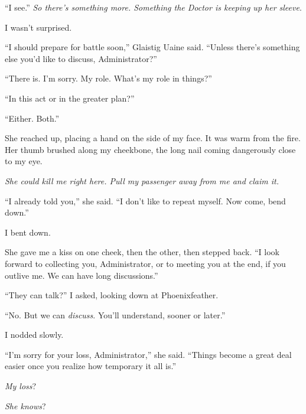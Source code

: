 ``I see.''  \emph{So there's something more.  Something the Doctor is keeping up her sleeve}.



I wasn't surprised.



``I should prepare for battle soon,'' Glaistig Uaine said.  ``Unless there's something else you'd like to discuss, Administrator?''



``There is.  I'm sorry.  My role.  What's my role in things?''



``In this act or in the greater plan?''



``Either.  Both.''



She reached up, placing a hand on the side of my face.  It was warm from the fire.  Her thumb brushed along my cheekbone, the long nail coming dangerously close to my eye.



\emph{She could kill me right here.  Pull my passenger away from me and claim it.}



``I already told you,'' she said.  ``I don't like to repeat myself.  Now come, bend down.''



I bent down.



She gave me a kiss on one cheek, then the other, then stepped back.  ``I look forward to collecting you, Administrator, or to meeting you at the end, if you outlive me.  We can have long discussions.''



``They can talk?'' I asked, looking down at Phoenixfeather.



``No.  But we can \emph{discuss}.  You'll understand, sooner or later.''



I nodded slowly.



``I'm sorry for your loss, Administrator,'' she said.  ``Things become a great deal easier once you realize how temporary it all is.''



\emph{My loss}?



\emph{She knows}?



